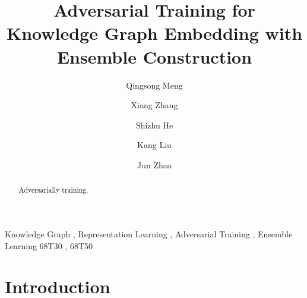 \documentclass[twocolumn,a4paper,10pt,preprint,3p]{elsarticle}
\begin{document}

\begin{frontmatter}

\title{Adversarial Training for Knowledge Graph Embedding with Ensemble Construction}


\author[hrbaddress]{Qingsong Meng}

\author[ucasaddress,hrbaddress]{Xiang Zhang}

\author[ucasaddress]{Shizhu He}

\author[ucasaddress]{Kang Liu}

\author[ucasaddress]{Jun Zhao}

\address[hrbaddress]{Harbin University of Science and Technology, No.52 Xuefu Road, Nangang District, Harbin, 150080, China}
\address[ucasaddress]{University of Chinese Academy of Sciences, No.19(A) Yuquan Road, Shijingshan District, Beijing, P.R.China 100049}


\begin{abstract}
Adversarially training.
\end{abstract}

\begin{keyword}
Knowledge Graph \sep{} Representation Learning \sep{} Adversarial Training \sep{} Ensemble Learning
\MSC[2010] 68T30 \sep{} 68T50
\end{keyword}

\end{frontmatter}


\linenumbers{}


\section{Introduction}
\label{sec:intro}
\end{document}
